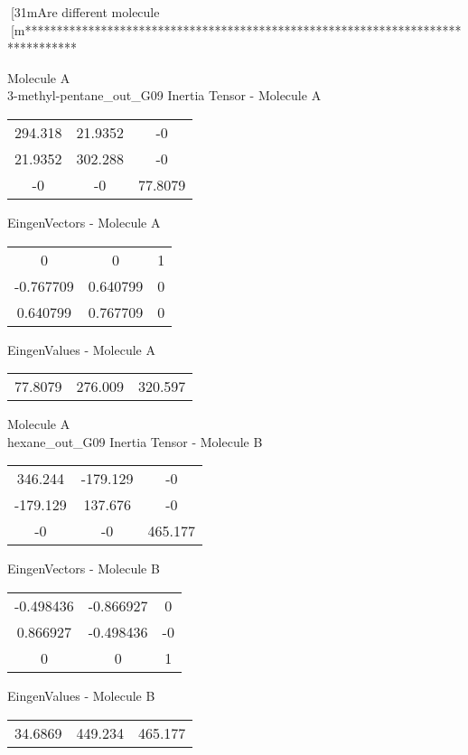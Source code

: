 [31mAre different molecule
[m********************************************************************************
\newpage
\begin{multicols}{2}
\begin{center}
Molecule A \\ 
3-methyl-pentane_out_G09
Inertia Tensor - Molecule A \\
\vtab
\begin{tabular}{|c c c|}
294.318	 & 	21.9352	 & 	-0	 \\
21.9352	 & 	302.288	 & 	-0	 \\
-0	 & 	-0	 & 	77.8079
\end{tabular}

\vtab
 EingenVectors - Molecule A     \\
\vtab
\begin{tabular}{|c c c|}
0	 & 	0	 & 	1	 \\
-0.767709	 & 	0.640799	 & 	0	 \\
0.640799	 & 	0.767709	 & 	0
\end{tabular}

\vtab
 EingenValues - Molecule A     \\
\vtab
\begin{tabular}{|c c c|}
77.8079	 & 	276.009	 & 	320.597
\end{tabular}
\columnbreak
Molecule A \\ 
hexane_out_G09
Inertia Tensor - Molecule B \\
\vtab
\begin{tabular}{|c c c|}
346.244	 & 	-179.129	 & 	-0	 \\
-179.129	 & 	137.676	 & 	-0	 \\
-0	 & 	-0	 & 	465.177
\end{tabular}

\vtab
 EingenVectors - Molecule B     \\
\vtab
\begin{tabular}{|c c c|}
-0.498436	 & 	-0.866927	 & 	0	 \\
0.866927	 & 	-0.498436	 & 	-0	 \\
0	 & 	0	 & 	1
\end{tabular}

\vtab
 EingenValues - Molecule B     \\
\vtab
\begin{tabular}{|c c c|}
34.6869	 & 	449.234	 & 	465.177
\end{tabular}
\end{center}
\end{multicols}
